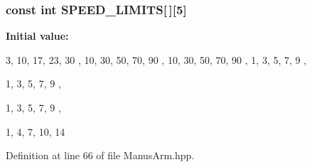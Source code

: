 \subsubsection[{\-S\-P\-E\-E\-D\-\_\-\-L\-I\-M\-I\-T\-S}]{\setlength{\rightskip}{0pt plus 5cm}const int {\bf \-S\-P\-E\-E\-D\-\_\-\-L\-I\-M\-I\-T\-S}[$\,$][5]}\label{ManusArm_8hpp_a48c715826efb7a9627e336881fb9441a}
{\bfseries \-Initial value\-:}
\begin{DoxyCode}
 { { 3, 10, 17, 23, 30 },  
                                                            { 10, 30, 50, 70, 
      90 }, 
                                                            { 10, 30, 50, 70, 
      90 }, 
                                                            { 1, 3, 5, 7, 9 }, 
           
                                                            { 1, 3, 5, 7, 9 }, 
           
                                                            { 1, 3, 5, 7, 9 }, 
           
                                                            { 1, 4, 7, 10, 14 }
       }
\end{DoxyCode}


\-Definition at line 66 of file \-Manus\-Arm.\-hpp.

